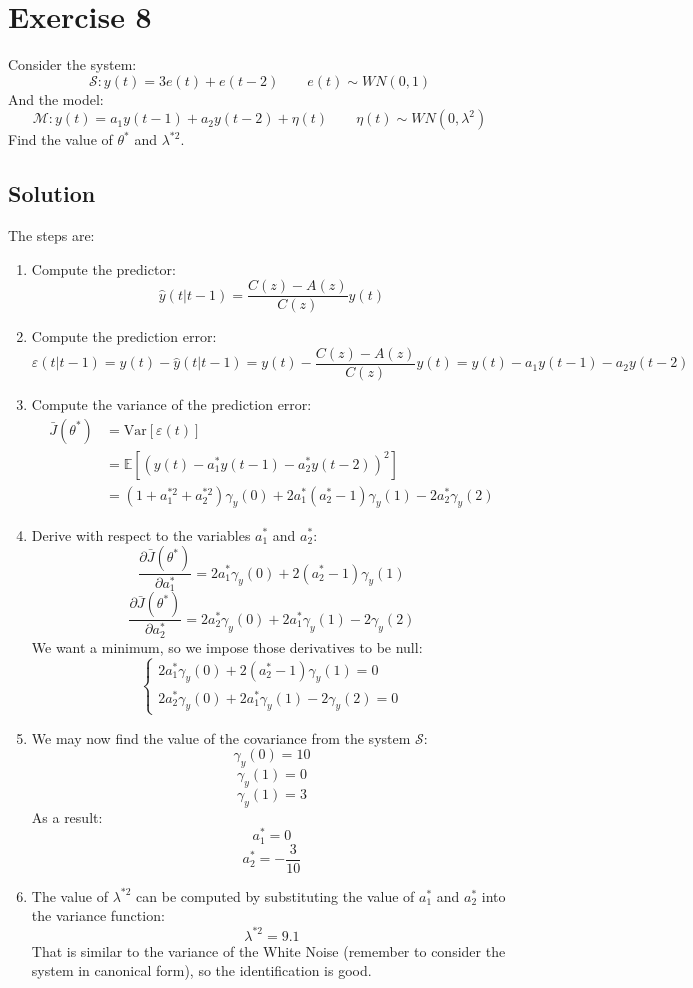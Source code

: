 \section{Exercise 8}

Consider the system: 
\[\mathcal{S}:y(t)=3e(t)+e(t-2)\qquad e(t)\sim WN(0,1)\]
And the model: 
\[\mathcal{M}:y(t)=a_1y(t-1)+a_2y(t-2)+\eta(t) \qquad \eta(t)\sim WN(0,\lambda^2)\]
Find the value of $\theta^\ast$ and $\lambda^{\ast 2}$. 

\subsection*{Solution}
The steps are: 
\begin{enumerate}
    \item Compute the predictor: 
        \[\hat{y}(t|t-1)=\dfrac{C(z)-A(z)}{C(z)}y(t)\]
    \item Compute the prediction error: 
        \[\varepsilon(t|t-1)=y(t)-\hat{y}(t|t-1)=y(t)-\dfrac{C(z)-A(z)}{C(z)}y(t)=y(t)-a_1y(t-1)-a_2y(t-2)\]
    \item Compute the variance of the prediction error: 
        \begin{align*}
            \bar{J}(\theta^\ast)    &=\text{Var}\left[\varepsilon(t)\right]\\   
                                    &=\mathbb{E}\left[ {\left(y(t)-a_1^\ast y(t-1)-a_2^\ast y(t-2)\right)}^2 \right] \\
                                    &=\left(1+a_1^{ \ast 2}+a_2^{\ast 2}\right)\gamma_y(0)+2a_1^\ast\left(a_2^\ast-1\right)\gamma_y(1)-2a_2^\ast\gamma_y(2)
        \end{align*}
    \item Derive with respect to the variables $a_1^\ast$ and $a_2^\ast$: 
        \[\dfrac{\partial\bar{J}(\theta^\ast)}{\partial a_1^\ast}=2a_1^\ast\gamma_y(0)+2(a_2^\ast-1)\gamma_y(1)\]
        \[\dfrac{\partial\bar{J}(\theta^\ast)}{\partial a_2^\ast}=2a_2^\ast\gamma_y(0)+2a_1^\ast\gamma_y(1)-2\gamma_y(2)\]
        We want a minimum, so we impose those derivatives to be null: 
        \[\begin{cases}
            2a_1^\ast\gamma_y(0)+2(a_2^\ast-1)\gamma_y(1)=0  \\
            2a_2^\ast\gamma_y(0)+2a_1^\ast\gamma_y(1)-2\gamma_y(2)=0
        \end{cases}\]
    \item We may now find the value of the covariance from the system $\mathcal{S}$: 
        \[\gamma_y(0)=10\]
        \[\gamma_y(1)=0\]
        \[\gamma_y(1)=3\]
        As a result: 
        \[a_1^\ast=0\]
        \[a_2^\ast=-\dfrac{3}{10}\]
    \item The value of $\lambda^{\ast 2}$ can be computed by substituting the value of $a_1^\ast$ and $a_2^\ast$ into the variance function: 
        \[\lambda^{\ast 2}=9.1\]
        That is similar to the variance of the  White Noise (remember to consider the system in canonical form), so the identification is good. 
\end{enumerate}